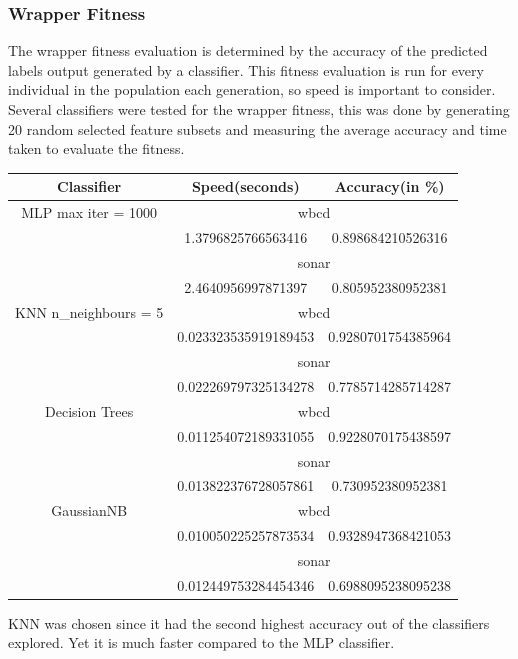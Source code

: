 \documentclass{article}
\begin{document}
\subsubsection*{Wrapper Fitness}
The wrapper fitness evaluation is determined by the accuracy of the predicted labels output generated by a classifier. This fitness evaluation is run for every individual in the population each generation, so speed is important to consider. Several classifiers were tested for the wrapper fitness, this was done by generating 20 random selected feature subsets and measuring the average accuracy and time taken to evaluate the fitness.  \par
\begin{center}
\begin{tabular}{|c|c|c|}
\hline
Classifier & Speed(seconds) & Accuracy(in \%)\\
\hline
MLP max iter = 1000 & \multicolumn{2}{c|}{wbcd} \\
\hline
& 1.3796825766563416 & 0.898684210526316 \\
\hline
& \multicolumn{2}{c|}{sonar} \\
\hline
 & 2.4640956997871397 & 0.805952380952381 \\
\hline
KNN n\_neighbours = 5 & \multicolumn{2}{c|}{wbcd} \\
& 0.023323535919189453 & 0.9280701754385964 \\
\hline
& \multicolumn{2}{c|}{sonar} \\
\hline
& 0.022269797325134278 & 0.7785714285714287 \\
\hline
Decision Trees & \multicolumn{2}{c|}{wbcd} \\
& 0.011254072189331055 & 0.9228070175438597 \\
\hline
& \multicolumn{2}{c|}{sonar} \\
\hline
& 0.013822376728057861 & 0.730952380952381 \\
\hline
GaussianNB & \multicolumn{2}{c|}{wbcd} \\
& 0.010050225257873534 & 0.9328947368421053 \\
\hline
& \multicolumn{2}{c|}{sonar} \\
\hline
& 0.012449753284454346 & 0.6988095238095238 \\
\hline
\end{tabular}
\end{center}
KNN was chosen since it had the second highest accuracy out of the classifiers explored. Yet it is much faster compared to the MLP classifier. \par
\end{document}
